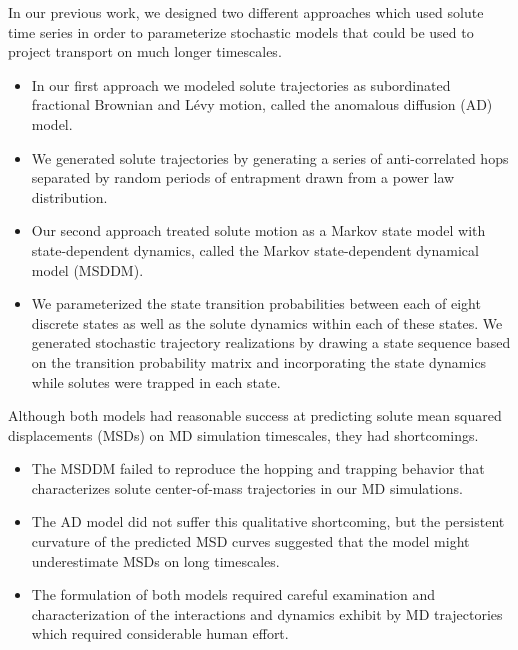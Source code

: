 \documentclass{article}
\begin{document}
  In our previous work, we designed two different approaches which used
  solute time series in order to parameterize stochastic models that could be used
  to project transport on much longer timescales.
  \begin{itemize}
  	\item In our first approach we modeled solute trajectories as subordinated fractional
  	Brownian and L\'evy motion, called the anomalous diffusion (AD) model. 
  	\item We generated solute trajectories by generating a series
  	of anti-correlated hops separated by random periods of entrapment drawn from a 
  	power law distribution.
  	\item Our second approach treated solute motion as a Markov state model with
  	state-dependent dynamics, called the Markov state-dependent dynamical model (MSDDM).
  	\item We parameterized the state transition probabilities between
  	each of eight discrete states as well as the solute dynamics within each of these
  	states. We generated stochastic trajectory realizations by drawing a state
  	sequence based on the transition probability matrix and incorporating the state dynamics
  	while solutes were trapped in each state.
  \end{itemize}
  
  Although both models had reasonable success at predicting solute mean squared 
  displacements (MSDs) on MD simulation timescales, they had shortcomings.
  \begin{itemize}
  	\item The MSDDM failed to reproduce the hopping and trapping behavior that
  	characterizes solute center-of-mass trajectories in our MD simulations.
  	\item The AD model did not suffer this qualitative shortcoming, but the 
  	persistent curvature of the predicted MSD curves suggested that the model
  	might underestimate MSDs on long timescales. 
  	\item The formulation of both models required careful examination and
  	characterization of the interactions and dynamics exhibit by MD trajectories 
  	which required considerable human effort.
  \end{itemize}
  
\end{document}
